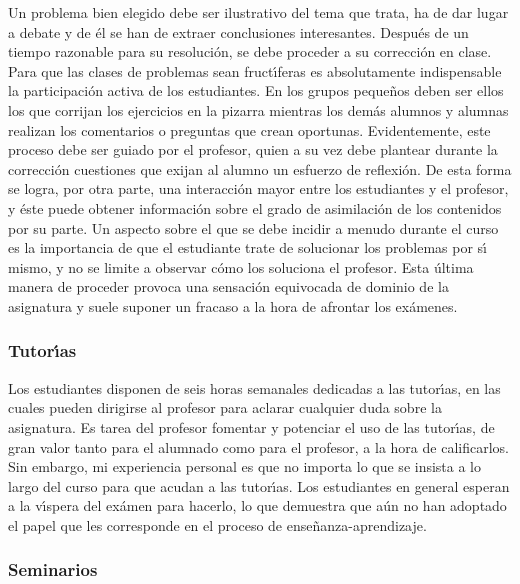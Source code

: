  Un problema bien elegido debe ser ilustrativo del tema que trata, 
ha de dar lugar a debate y de \'{e}l se han de extraer conclusiones 
interesantes. 
Despu\'{e}s de un tiempo razonable para su resoluci\'{o}n,
 se debe proceder a su correcci\'{o}n en clase. 
Para que las clases de problemas sean fruct\'{\i}feras es 
absolutamente indispensable la participaci\'{o}n activa de los estudiantes.
 En los grupos peque\~{n}os deben ser ellos los que corrijan los ejercicios en 
la pizarra mientras los dem\'{a}s alumnos y alumnas 
realizan los comentarios o preguntas 
que crean oportunas. 
Evidentemente, este proceso debe ser guiado por el profesor, 
quien a su vez debe plantear durante la correcci\'{o}n cuestiones
 que exijan al alumno un esfuerzo de reflexi\'{o}n.
 De esta forma se logra, por otra parte, una interacci\'{o}n mayor 
entre los estudiantes y el profesor, y \'{e}ste  puede obtener 
informaci\'{o}n sobre el grado de asimilaci\'{o}n de los contenidos por su
parte. Un aspecto sobre el que se debe incidir
 a menudo durante el curso es la importancia de que el estudiante
 trate de solucionar los problemas por s\'{\i} mismo, 
y no se limite a observar c\'{o}mo los soluciona el profesor.
 Esta \'{u}ltima manera de  proceder provoca una sensaci\'{o}n
 equivocada de dominio de la asignatura y suele suponer un
 fracaso a la hora de afrontar los ex\'{a}menes.


\subsubsection{Tutor\'{\i}as}

Los estudiantes disponen de seis horas semanales dedicadas a las tutor\'{\i}as,
 en las cuales pueden dirigirse al profesor para aclarar cualquier duda
 sobre la asignatura.
 Es tarea del profesor fomentar
 y potenciar el uso de las tutor\'{\i}as, de gran valor tanto 
para el alumnado como para el profesor, a la hora de calificarlos.
Sin embargo, mi experiencia personal es que no importa lo que  se insista a lo 
largo del curso para que acudan a  las tutor\'{\i}as. Los estudiantes
 en general esperan a 
la v\'{\i}spera del ex\'{a}men para hacerlo, lo que demuestra que a\'{u}n 
no han adoptado el papel que les corresponde en el proceso de ense\~{n}anza-aprendizaje.


\subsubsection{Seminarios}

